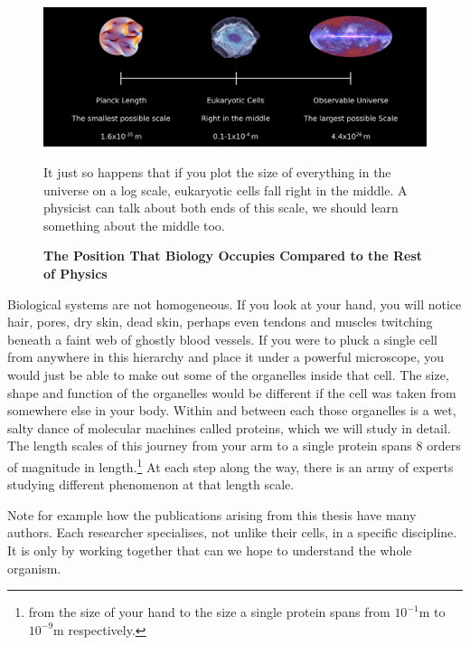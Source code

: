 \begin{figure}
	\begin{center}
		\includegraphics[width=1.0\textwidth]{figures/scales.png}
	\end{center}
	\captionsetup{singlelinecheck = false, justification=raggedright}
	\caption[The Position That Biology Occupies Compared to the Rest of Physics] {\textbf{The Position That Biology Occupies Compared to the Rest of Physics}}{It just so happens that if you plot the size of everything  in the universe on a log scale, eukaryotic cells fall right in the middle. A physicist can talk about both ends of this scale, we should learn something about the middle too.}
	\label{length_scales}
\end{figure}

Biological systems are not homogeneous. If you look at your hand, you will notice hair, pores, dry skin, dead skin, perhaps even tendons and muscles twitching beneath a faint web of ghostly blood vessels. If you were to pluck a single cell from anywhere in this hierarchy and place it under a powerful microscope, you would just be able to make out some of the organelles inside that cell. The size, shape and function of the organelles would be different if the cell was taken from somewhere else in your body. Within and between each those organelles is a wet, salty dance of molecular machines called proteins, which we will study in detail. The length scales of this journey from your arm to a single protein spans 8 orders of magnitude in length.\footnote{ from the size of your hand to the size a single protein spans from $10^{-1}$m  to $10^{-9}$m respectively.} At each step along the way, there is an army of experts studying different phenomenon at that length scale. 

Note for example how the publications arising from this thesis have many authors. Each researcher specialises, not unlike their cells, in a specific discipline. It is only by working together that can we hope to understand the whole organism.


